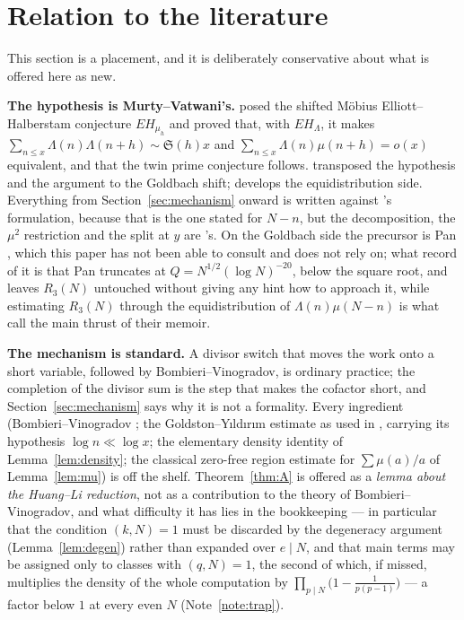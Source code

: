 \documentclass[11pt,a4paper]{article}
\theoremstyle{plain}
\theoremstyle{definition}
\theoremstyle{remark}
\renewcommand{\SS}{\mathfrak{S}}
\begin{document}
\section{Relation to the literature}\label{sec:lit}

This section is a placement, and it is deliberately conservative about
what is offered here as new.

\medskip\noindent
\textbf{The hypothesis is Murty--Vatwani's.} \cite{MV17} posed the
shifted M\"obius Elliott--Halberstam conjecture $EH_{\mu_h}$ and proved
that, with $EH_\Lambda$, it makes
$\sum_{n\le x}\Lambda(n)\Lambda(n+h)\sim\SS(h)x$ and
$\sum_{n\le x}\Lambda(n)\mu(n+h)=o(x)$ equivalent, and that the twin
prime conjecture follows. \cite{HL} transposed the hypothesis and the
argument to the Goldbach shift; \cite{Vat19} develops the
equidistribution side. Everything from
Section~\ref{sec:mechanism} onward is written against \cite{HL}'s
formulation, because that is the one stated for $N-n$, but the
decomposition, the $\mu^2$ restriction and the split at $y$ are
\cite{MV17}'s. On the Goldbach side the precursor is
Pan \cite{Pan}, which this paper has not been able to consult and does
not rely on; what \cite{HL} record of it is that Pan truncates at
$Q=N^{1/2}(\log N)^{-20}$, below the square root, and leaves $R_3(N)$
untouched without giving any hint how to approach it, while estimating
$R_3(N)$ through the equidistribution of $\Lambda(n)\mu(N-n)$ is what
\cite{HL} call the main thrust of their memoir.

\medskip\noindent
\textbf{The mechanism is standard.} A divisor switch that moves the
work onto a short variable, followed by Bombieri--Vinogradov, is
ordinary practice; the completion of the divisor sum is the step that
makes the cofactor short, and Section~\ref{sec:mechanism} says why it
is not a formality. Every ingredient (Bombieri--Vinogradov \cite{MoV2};
the Goldston--Y{\i}ld{\i}r{\i}m estimate \cite{GY} as used in
\cite{HL}, carrying its hypothesis $\log n\ll\log x$; the elementary
density identity of Lemma~\ref{lem:density}; the classical zero-free
region estimate for $\sum\mu(a)/a$ of Lemma~\ref{lem:mu}) is off the
shelf. Theorem~\ref{thm:A} is offered as a \emph{lemma about the
Huang--Li reduction}, not as a contribution to the theory of
Bombieri--Vinogradov, and what difficulty it has lies in the
bookkeeping --- in particular that the condition $(k,N)=1$ must be
discarded by the degeneracy argument (Lemma~\ref{lem:degen}) rather
than expanded over $e\mid N$, and that main terms may be assigned only
to classes with $(q,N)=1$, the second of which, if missed, multiplies
the density of the whole computation by
$\prod_{p\mid N}\bigl(1-\tfrac{1}{p(p-1)}\bigr)$ --- a factor below $1$
at every even $N$ (Note~\ref{note:trap}).
\end{document}
